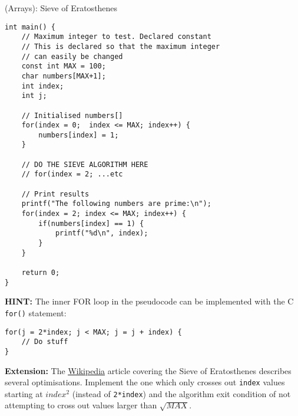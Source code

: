 \documentclass{lab}
\begin{document}
\begin{task}{(Arrays): Sieve of Eratosthenes}{}
\begin{lstlisting}[style=Ctable]
int main() {
	// Maximum integer to test. Declared constant
	// This is declared so that the maximum integer
	// can easily be changed
	const int MAX = 100;
	char numbers[MAX+1];
	int index;
	int j;

	// Initialised numbers[]
	for(index = 0;	index <= MAX; index++) {
		numbers[index] = 1;
	}

	// DO THE SIEVE ALGORITHM HERE
	// for(index = 2; ...etc
	
	// Print results
	printf("The following numbers are prime:\n");
	for(index = 2; index <= MAX; index++) {
		if(numbers[index] == 1) {
			printf("%d\n", index);
		}
	}
	
	return 0;
}
\end{lstlisting}
\textbf{HINT:} The inner FOR loop in the pseudocode can be implemented with the C \texttt{for()} statement:
\begin{lstlisting}[style=Ctable]
for(j = 2*index; j < MAX; j = j + index) {
	// Do stuff
}
\end{lstlisting}
\textbf{Extension:} The \underline{\href{https://en.wikipedia.org/wiki/Sieve_of_Eratosthenes}{Wikipedia}} article covering the Sieve of Eratosthenes describes several optimisations. Implement the one which only crosses out \texttt{index} values starting at $index^2$ (instead of \texttt{2*index}) and the algorithm exit condition of not attempting to cross out values larger than $\sqrt{MAX}$.
\end{task}
\end{document}
